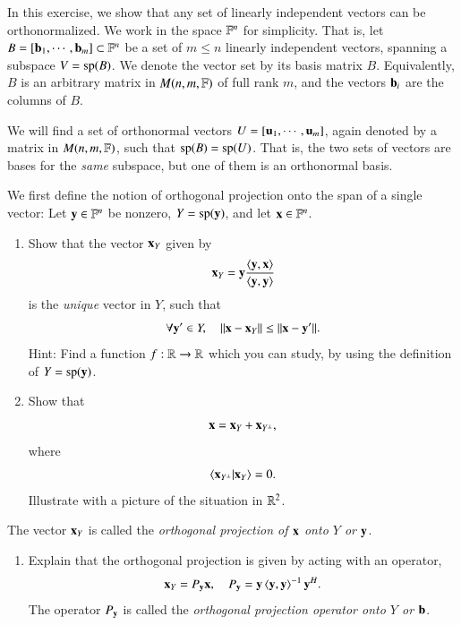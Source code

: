 \documentclass[12pt]{report}
\begin{document}
In this exercise, we show that any set of linearly independent vectors can be orthonormalized. We work in the space $\mathbb{F}^n$ for simplicity. That is, let $B = [\mathbf{b}_1,\cdots,\mathbf{b}_m]\subset \mathbb{F}^n$ be a set of $m \leq n$ linearly independent vectors, spanning a subspace $V = \operatorname{sp}(B)$. We denote the vector set by its basis matrix $B$. Equivalently, $B$ is an arbitrary matrix in $M(n,m,\mathbb{F})$ of full rank $m$, and the vectors $\mathbf{b}_i$ are the columns of $B$.

We will find a set of orthonormal vectors $U = [\mathbf{u}_1,\cdots,\mathbf{u}_m]$, again denoted by a matrix in $M(n,m,\mathbb{F})$, such that $\operatorname{sp}(B) = \operatorname{sp}(U)$. That is, the two sets of vectors are bases for the \emph{same} subspace, but one of them is an orthonormal basis.

We first define the notion of orthogonal projection onto the span of a single vector: Let $\mathbf{y}\in \mathbb{F}^n$ be nonzero, $Y = \operatorname{sp}(\mathbf{y})$, and let $\mathbf{x} \in \mathbb{F}^n$.
\begin{enumerate}
    \item Show that the vector $\mathbf{x}_Y$ given by
    \begin{equation}
        \mathbf{x}_Y = \mathbf{y}\frac{\braket{\mathbf{y}, \mathbf{x}}}{\braket{\mathbf{y},\mathbf{y}}} 
    \end{equation}
    is the \emph{unique} vector in $Y$, such that
    \begin{equation}
        \forall \mathbf{y}' \in Y, \quad \|\mathbf{x} - \mathbf{x}_Y\| \leq \|\mathbf{x} - \mathbf{y}'\|.
    \end{equation}
    Hint: Find a function $f : \mathbb{R} \to \mathbb{R}$ which you can study, by using the definition of $Y = \operatorname{sp}(\mathbf{y})$.
    \item
    Show that
    \begin{equation}
        \mathbf{x} = \mathbf{x}_Y + \mathbf{x}_{Y^\bot},
    \end{equation}
    where
    \begin{equation}
        \braket{\mathbf{x}_{Y^\bot}|\mathbf{x}_Y} = 0.
    \end{equation}
    Illustrate with a picture of the situation in $\mathbb{R}^2$.
\end{enumerate}
The vector $\mathbf{x}_Y$ is called the \emph{orthogonal projection of $\mathbf{x}$ onto $Y$ or $\mathbf{y}$}.
\begin{enumerate}[resume]
\item Explain that the orthogonal projection is given by acting with an operator, 
\begin{equation}
    \mathbf{x}_Y = P_{\mathbf{y}} \mathbf{x}, \quad P_{\mathbf{y}} = \mathbf{y} \braket{\mathbf{y},\mathbf{y}}^{-1} \mathbf{y}^H.
\end{equation}
The operator $P_{\mathbf{y}}$ 
is called the \emph{orthogonal projection operator onto $Y$ or  $\mathbf{b}$}.
\end{enumerate}
\end{document}
